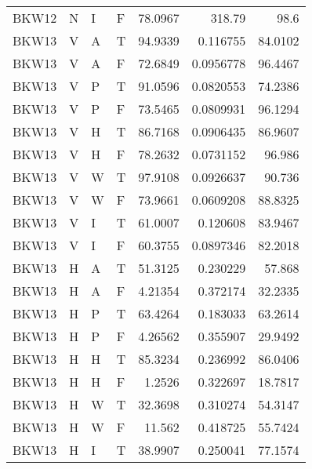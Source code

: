 \begin{longtable}{llllrrr}
    BKW12    & N         & I         & F          & 78.0967    & 318.79      & 98.6     \\
    BKW13    & V         & A         & T          & 94.9339    & 0.116755    & 84.0102  \\
    BKW13    & V         & A         & F          & 72.6849    & 0.0956778   & 96.4467  \\
    BKW13    & V         & P         & T          & 91.0596    & 0.0820553   & 74.2386  \\
    BKW13    & V         & P         & F          & 73.5465    & 0.0809931   & 96.1294  \\
    BKW13    & V         & H         & T          & 86.7168    & 0.0906435   & 86.9607  \\
    BKW13    & V         & H         & F          & 78.2632    & 0.0731152   & 96.986   \\
    BKW13    & V         & W         & T          & 97.9108    & 0.0926637   & 90.736   \\
    BKW13    & V         & W         & F          & 73.9661    & 0.0609208   & 88.8325  \\
    BKW13    & V         & I         & T          & 61.0007    & 0.120608    & 83.9467  \\
    BKW13    & V         & I         & F          & 60.3755    & 0.0897346   & 82.2018  \\
    BKW13    & H         & A         & T          & 51.3125    & 0.230229    & 57.868   \\
    BKW13    & H         & A         & F          & 4.21354    & 0.372174    & 32.2335  \\
    BKW13    & H         & P         & T          & 63.4264    & 0.183033    & 63.2614  \\
    BKW13    & H         & P         & F          & 4.26562    & 0.355907    & 29.9492  \\
    BKW13    & H         & H         & T          & 85.3234    & 0.236992    & 86.0406  \\
    BKW13    & H         & H         & F          & 1.2526     & 0.322697    & 18.7817  \\
    BKW13    & H         & W         & T          & 32.3698    & 0.310274    & 54.3147  \\
    BKW13    & H         & W         & F          & 11.562     & 0.418725    & 55.7424  \\
    BKW13    & H         & I         & T          & 38.9907    & 0.250041    & 77.1574  \\

\end{longtable}
